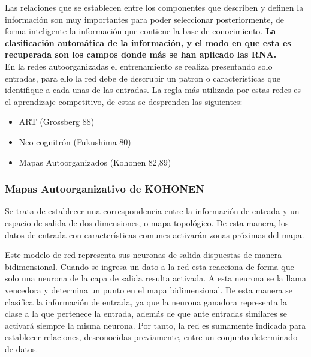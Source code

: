 \documentclass[journal]{IEEEtran}
\begin{document}
Las relaciones que se establecen entre los componentes que describen y definen la información son muy importantes para poder seleccionar posteriormente, de forma inteligente la información que contiene la base de conocimiento. \textbf{La clasificación automática de la información, y el modo en que esta es recuperada son los campos donde más se han aplicado las RNA.}\\

En la redes autoorganizadas el entrenamiento se realiza presentando solo entradas, para ello la red debe de descrubir un patron o características que identifique a cada unas de las entradas. La regla más utilizada por estas redes es el aprendizaje competitivo, de estas se desprenden las siguientes:

\begin{itemize}
\item ART (Grossberg 88)
\item Neo-cognitrón (Fukushima 80)
\item Mapas Autoorganizados (Kohonen 82,89)\\
\end{itemize}
   
\subsubsection{\textbf{Mapas Autoorganizativo de KOHONEN}}
    
Se trata de establecer una correspondencia entre la información de entrada y un espacio de salida de dos dimensiones, o mapa topológico. De esta manera, los datos de entrada con características comunes activarán zonas próximas del mapa.
    
Este modelo de red representa sus neuronas de salida dispuestas de manera bidimensional. Cuando se ingresa un dato a la red esta reacciona de forma que solo una neurona de la capa de salida resulta activada. A esta neurona se la llama vencedora y determina un punto en el mapa bidimensional. De esta manera se clasifica la información de entrada, ya que la neurona ganadora representa la clase a la que pertenece la entrada, además de que ante entradas similares se activará siempre la misma neurona. Por tanto, la red es sumamente indicada para establecer relaciones, desconocidas previamente, entre un conjunto determinado de datos.
    
\end{document}
